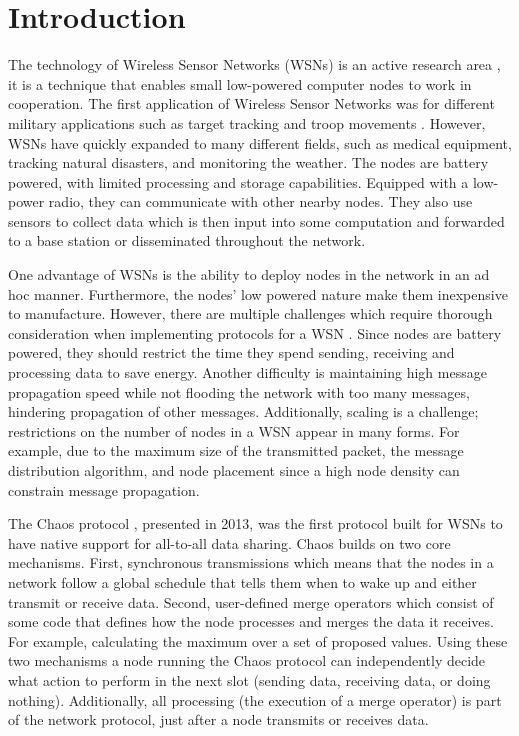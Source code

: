 \chapter{Introduction}
The technology of Wireless Sensor Networks (WSNs) is an active research area \cite{Yick2008-wsn-survey, Mahmood2015-reliability-survey}, it is a technique that enables small low-powered computer nodes to work in cooperation. The first application of Wireless Sensor Networks was for different military applications such as target tracking and troop movements \cite{Yick2008-wsn-survey}. However, WSNs have quickly expanded to many different fields, such as medical equipment, tracking natural disasters, and monitoring the weather. The nodes are battery powered, with limited processing and storage capabilities. Equipped with a low-power radio, they can communicate with other nearby nodes. They also use sensors to collect data which is then input into some computation and forwarded to a base station or disseminated throughout the network.

One advantage of WSNs is the ability to deploy nodes in the network in an ad hoc manner. Furthermore, the nodes' low powered nature make them inexpensive to manufacture. However, there are multiple challenges which require thorough consideration when implementing protocols for a WSN \cite{Yick2008-wsn-survey}. Since nodes are battery powered, they should restrict the time they spend sending, receiving and processing data to save energy. Another difficulty is maintaining high message propagation speed while not flooding the network with too many messages, hindering propagation of other messages. Additionally, scaling is a challenge; restrictions on the number of nodes in a WSN appear in many forms. For example, due to the maximum size of the transmitted packet, the message distribution algorithm, and node placement since a high node density can constrain message propagation.

The Chaos protocol \cite{chaos-introduction-paper}, presented in 2013, was the first protocol built for WSNs to have native support for all-to-all data sharing. Chaos builds on two core mechanisms. First, synchronous transmissions which means that the nodes in a network follow a global schedule that tells them when to wake up and either transmit or receive data. Second, user-defined merge operators which consist of some code that defines how the node processes and merges the data it receives. For example, calculating the maximum over a set of proposed values. Using these two mechanisms a node running the Chaos protocol can independently decide what action to perform in the next slot (sending data, receiving data, or doing nothing). Additionally, all processing (the execution of a merge operator) is part of the network protocol, just after a node transmits or receives data.

